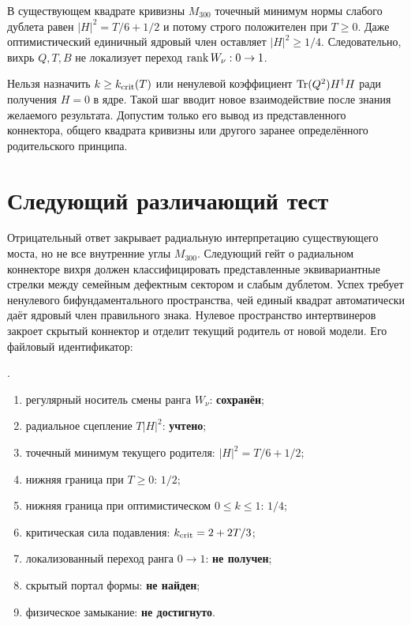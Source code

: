 \begin{theorem}
В существующем квадрате кривизны $M_{300}$ точечный минимум нормы слабого
дублета равен $|H|^2=T/6+1/2$ и потому строго положителен при $T\geq0$.
Даже оптимистический единичный ядровый член оставляет
$|H|^2\geq1/4$. Следовательно, вихрь $Q,T,B$ не локализует переход
$\operatorname{rank} W_\nu:0\to1$.
\end{theorem}

\begin{nogocriterion}
Нельзя назначить $k\geq k_{\rm crit}(T)$ или ненулевой коэффициент
$\operatorname{Tr}(Q^2)H^\dagger H$ ради получения $H=0$ в ядре. Такой шаг вводит
новое взаимодействие после знания желаемого результата. Допустим только
его вывод из представленного коннектора, общего квадрата кривизны или
другого заранее определённого родительского принципа.
\end{nogocriterion}

\section{Следующий различающий тест}

Отрицательный ответ закрывает радиальную интерпретацию существующего
моста, но не все внутренние углы $M_{300}$. Следующий гейт о радиальном
коннекторе вихря должен классифицировать представленные эквивариантные стрелки между
семейным дефектным сектором и слабым дублетом. Успех требует ненулевого
бифундаментального пространства, чей единый квадрат автоматически даёт
ядровый член правильного знака. Нулевое пространство интертвинеров
закроет скрытый коннектор и отделит текущий родитель от новой модели.
Его файловый идентификатор:
\begin{sloppypar}
.
\end{sloppypar}

\begin{protocol}
\begin{enumerate}
 \item регулярный носитель смены ранга $W_\nu$: \textbf{сохранён};
 \item радиальное сцепление $T|H|^2$: \textbf{учтено};
 \item точечный минимум текущего родителя:
 \textbf{$|H|^2=T/6+1/2$};
 \item нижняя граница при $T\geq0$: \textbf{$1/2$};
 \item нижняя граница при оптимистическом $0\leq k\leq1$:
 \textbf{$1/4$};
 \item критическая сила подавления:
 \textbf{$k_{\rm crit}=2+2T/3$};
 \item локализованный переход ранга $0\to1$:
 \textbf{не получен};
 \item скрытый портал формы: \textbf{не найден};
 \item физическое замыкание: \textbf{не достигнуто}.
\end{enumerate}
\end{protocol}

